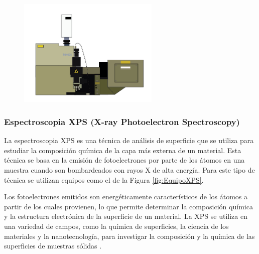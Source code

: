 \documentclass[12pt]{article}
\begin{document}
        \begin{figure}[H]
            	   \begin{center}
             	  	\includegraphics[width = 0.6\textwidth]{Imagenes/raman_equipo.png}
            	   \end{center} 
                \end{figure}
                
        \subsubsection{Espectroscopia XPS (X-ray Photoelectron Spectroscopy)}
        
        La espectroscopia XPS es una técnica de análisis de superficie que se utiliza para estudiar la composición química de la capa más externa de un material. Esta técnica se basa en la emisión de fotoelectrones por parte de los átomos en una muestra cuando son bombardeados con rayos X de alta energía. Para este tipo de técnica se utilizan equipos como el de la Figura \ref{fig:EquipoXPS}. \vspace{1em} %
        
        Los fotoelectrones emitidos son energéticamente característicos de los átomos a partir de los cuales provienen, lo que permite determinar la composición química y la estructura electrónica de la superficie de un material. La XPS se utiliza en una variedad de campos, como la química de superficies, la ciencia de los materiales y la nanotecnología, para investigar la composición y la química de las superficies de muestras sólidas \cite{IEEEreferencias:XPS}.
        
\end{document}
